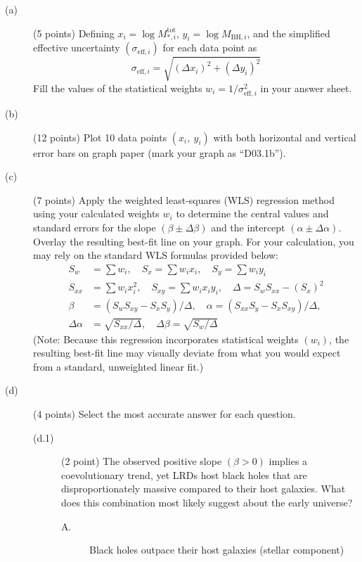 \begin{description}
\item[(a)] (5 points) Defining $x_i = \log M_{*,i}^{\mathrm{tot}}$,
  $y_i = \log M_{\mathrm{BH},i}$, and the simplified effective uncertainty
  $(\sigma_{\mathrm{eff},i})$ for each data point as
  \[
  \sigma_{\mathrm{eff},i} = \sqrt{(\Delta x_i)^2 + (\Delta y_i)^2}
  \]
  Fill the values of the statistical weights
  $w_i = 1/\sigma_{\mathrm{eff},i}^2$ in your answer sheet.
\item[(b)] (12 points) Plot 10 data points $(x_i,\ y_i)$ with both horizontal
  and vertical error bars on graph paper (mark your graph as ``D03.1b'').
\item[(c)] (7 points) Apply the weighted least-squares (WLS) regression method
  using your calculated weights $w_i$ to determine the central values and
  standard errors for the slope $(\beta \pm \Delta\beta)$ and the intercept
  $(\alpha \pm \Delta\alpha)$. Overlay the resulting best-fit line on your
  graph. For your calculation, you may rely on the standard WLS formulas
  provided below:
  \begin{align*}
    S_w &= \sum w_i, \quad S_x = \sum w_i x_i, \quad S_y = \sum w_i y_i \\
    S_{xx} &= \sum w_i x_i^2, \quad S_{xy} = \sum w_i x_i y_i, \quad
      \Delta = S_w S_{xx} - (S_x)^2 \\
    \beta &= (S_w S_{xy} - S_x S_y)/\Delta, \quad
    \alpha = (S_{xx} S_y - S_x S_{xy})/\Delta, \\
    \Delta\alpha &= \sqrt{S_{xx}/\Delta}, \quad
    \Delta\beta = \sqrt{S_w/\Delta}
  \end{align*}
  (Note: Because this regression incorporates statistical weights $(w_i)$, the
  resulting best-fit line may visually deviate from what you would expect from
  a standard, unweighted linear fit.)
\item[(d)] (4 points) Select the most accurate answer for each question.
  \begin{description}
  \item[(d.1)] (2 point) The observed positive slope $(\beta > 0)$ implies a
    coevolutionary trend, yet LRDs host black holes that are disproportionately
    massive compared to their host galaxies. What does this combination most
    likely suggest about the early universe?
    \begin{description}
    \item[A.] Black holes outpace their host galaxies (stellar component)

\end{description}
\end{description}
\end{description}
